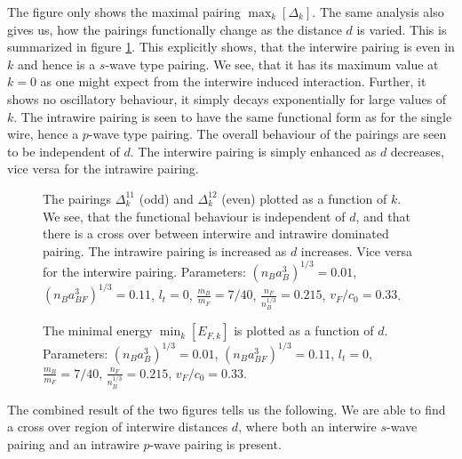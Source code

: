 The figure only shows the maximal pairing $\max_k[\Delta_k]$. The same analysis also gives us, how the pairings functionally change as the distance $d$ is varied. This is summarized in figure \ref{fig.pairingkdependT0dvaried}. This explicitly shows, that the interwire pairing is even in $k$ and hence is a $s$-wave type pairing. We see, that it has its maximum value at $k=0$ as one might expect from the interwire induced interaction. Further, it shows no oscillatory behaviour, it simply decays exponentially for large values of $k$. The intrawire pairing is seen to have the same functional form as for the single wire, hence a $p$-wave type pairing. The overall behaviour of the pairings are seen to be independent of $d$. The interwire pairing is simply enhanced as $d$ decreases, vice versa for the intrawire pairing.  

\begin{figure} 
\begin{center}  
  
\caption{The pairings $\Delta^{11}_k$ (odd) and $\Delta^{12}_k$ (even) plotted as a function of $k$. We see, that the functional behaviour is independent of $d$, and that there is a cross over between interwire and intrawire dominated pairing. The intrawire pairing is increased as $d$ increases. Vice versa for the interwire pairing. Parameters: $(n_Ba_B^3)^{1/3} = 0.01$, $(n_Ba_{BF}^3)^{1/3} = 0.11$, $l_t = 0$, $\frac{m_B}{m_F} = 7/40$, $\frac{n_F}{n_B^{1/3}} = 0.215$, $v_F/c_0 = 0.33$. }  
\label{fig.pairingkdependT0dvaried}  
\end{center}    
\end{figure}

\begin{figure} 
\begin{center}  
  
\caption{The minimal energy $\min_k[E_{F,k}]$ is plotted as a function of $d$. Parameters: $(n_Ba_B^3)^{1/3} = 0.01$, $(n_Ba_{BF}^3)^{1/3} = 0.11$, $l_t = 0$, $\frac{m_B}{m_F} = 7/40$, $\frac{n_F}{n_B^{1/3}} = 0.215$, $v_F/c_0 = 0.33$. }  
\label{fig.twowirescrossoverminimalenergy}  
\end{center}    
\end{figure}

The combined result of the two figures tells us the following. We are able to find a cross over region of interwire distances $d$, where both an interwire $s$-wave pairing and an intrawire $p$-wave pairing is present.

